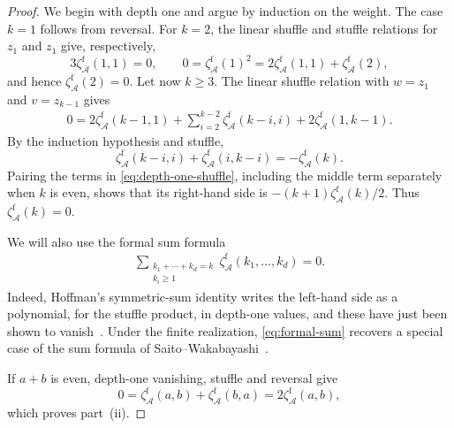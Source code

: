 \documentclass[12pt]{amsart}
\numberwithin{equation}{section}
\theoremstyle{plain}
\newcommand{\zaf}[1]{\zeta_{\mathcal A}^{\mathrm f}(#1)}
\begin{document}
\begin{proof}
We begin with depth one and argue by induction on the weight. The case $k=1$ follows from reversal. For $k=2$, the linear shuffle and stuffle relations for $z_1$ and $z_1$ give, respectively,
\[
 3\zaf{1,1}=0,
 \qquad
 0=\zaf{1}^2=2\zaf{1,1}+\zaf{2},
\]
and hence $\zaf{2}=0$. Let now $k\geq3$. The linear shuffle relation with $w=z_1$ and $v=z_{k-1}$ gives
\begin{align}\label{eq:depth-one-shuffle}
 0=2\zaf{k-1,1}+\sum_{i=2}^{k-2}\zaf{k-i,i}+2\zaf{1,k-1}.
\end{align}
By the induction hypothesis and stuffle,
\[
 \zaf{k-i,i}+\zaf{i,k-i}=-\zaf{k}.
\]
Pairing the terms in \eqref{eq:depth-one-shuffle}, including the middle term separately when $k$ is even, shows that its right-hand side is $-(k+1)\zaf{k}/2$. Thus $\zaf{k}=0$.

We will also use the formal sum formula
\begin{align}\label{eq:formal-sum}
 \sum_{\substack{k_1+\cdots+k_d=k\\k_i\geq1}}
 \zaf{k_1,\ldots,k_d}=0.
\end{align}
Indeed, Hoffman's symmetric-sum identity writes the left-hand side as a polynomial, for the stuffle product, in depth-one values, and these have just been shown to vanish~\cite{Hoffman}. Under the finite realization, \eqref{eq:formal-sum} recovers a special case of the sum formula of Saito--Wakabayashi~\cite{SW}.

If $a+b$ is even, depth-one vanishing, stuffle and reversal give
\[
 0=\zaf{a,b}+\zaf{b,a}=2\zaf{a,b},
\]
which proves part~(ii).


\end{proof}
\end{document}
